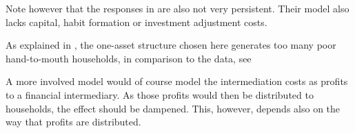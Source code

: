 \documentclass[12pt]{article} %
\numberwithin{equation}{section} %
\begin{document}

Note however that the responses in \textcite{gl2017} are also not very persistent. Their model also lacks capital, habit formation or investment adjustment costs.

As explained in \textcite{kv2018}, the one-asset structure chosen here generates too many poor hand-to-mouth households, in comparison to the data, see \textcite{kaplan2014}

A more involved model would of course model the intermediation costs as profits to a financial intermediary. As those profits would then be distributed to households, the effect should be dampened. This, however, depends also on the way that profits are distributed.

\end{document}
